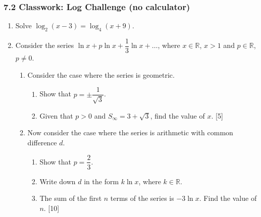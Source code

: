 \documentclass[12pt, twoside]{article}
\begin{document}
\subsubsection*{7.2 Classwork: Log Challenge (no calculator)}

\begin{enumerate}[itemsep=0.15cm]

\item[1.] [Maximum mark: 7]

Solve $\log_2(x - 3) = \log_4(x + 9)$.


\newpage

\item[2.] [Maximum mark: 15]

\begingroup
\setlength{\parskip}{0pt}
\setlength{\parsep}{0pt}

Consider the series $\ln x + p \ln x + \dfrac{1}{3} \ln x + \ldots$,
where $x \in \mathbb{R}$, $x > 1$ and $p \in \mathbb{R}$, $p \neq 0$.

\begin{enumerate}[itemsep=0.05cm, topsep=0.05cm]
  \item Consider the case where the series is geometric.
  \begin{enumerate}[itemsep=0.02cm, topsep=0.02cm, label=(\roman*)]
    \item Show that $p = \pm \dfrac{1}{\sqrt{3}}$.
    \item Given that $p > 0$ and $S_{\infty} = 3 + \sqrt{3}$,
    find the value of $x$. \hfill [5]
  \end{enumerate}

  \item Now consider the case where the series is arithmetic with common
  difference $d$.
  \begin{enumerate}[itemsep=0.02cm, topsep=0.02cm, label=(\roman*)]
    \item Show that $p = \dfrac{2}{3}$.
    \item Write down $d$ in the form $k \ln x$, where $k \in \mathbb{R}$.
    \item The sum of the first $n$ terms of the series is $-3 \ln x$.
    Find the value of $n$. \hfill [10]
  \end{enumerate}
\end{enumerate}
\endgroup


\end{enumerate}
\end{document}
